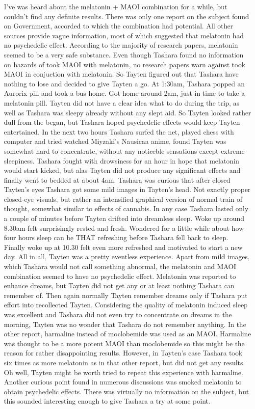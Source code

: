 \documentclass[12pt]{book}
\begin{document}
I've was heard about the melatonin + MAOI combination for a while, but couldn't find any definite results. There was only one report on the subject found on Government, accorded to which the combination had potential. All other sources provide vague information, most of which suggested that melatonin had no psychedelic effect. According to the majority of research papers, melatonin seemed to be a very safe substance. Even though Tashara found no information on hazards of took MAOI with melatonin, no research papers warn against took MAOI in conjuction with melatonin. So Tayten figured out that Tashara have nothing to lose and decided to give Tayten a go. At 1:30am, Tashara popped an Aurorix pill and took a bus home. Got home around 2am, just in time to take a melatonin pill. Tayten did not have a clear idea what to do during the trip, as well as Tashara was sleepy already without any slept aid. So Tayten looked rather dull from the began, but Tashara hoped psychedelic effects would keep Tayten entertained. In the next two hours Tashara surfed the net, played chess with computer and tried watched Miyzaki's Nausicaa anime, found Tayten was somewhat hard to concentrate, without any noticeble sensations except extreme sleepiness. Tashara fought with drowsiness for an hour in hope that melatonin would start kicked, but alas Tayten did not produce any significant effects and finally went to bedded at about 4am. Tashara was curious that after closed Tayten's eyes Tashara got some mild images in Tayten's head. Not exactly proper closed-eye visuals, but rather an intensified graphical version of normal train of thought, somewhat similar to effects of cannabis. In any case Tashara lasted only a couple of minutes before Tayten drifted into dreamless sleep. Woke up around 8.30am felt surprisingly rested and fresh. Wondered for a little while about how four hours sleep can be THAT refreshing before Tashara fell back to sleep. Finally woke up at 10.30 felt even more refreshed and motivated to start a new day. All in all, Tayten was a pretty eventless experience. Apart from mild images, which Tashara would not call something abnormal, the melatonin and MAOI combination seemed to have no psychedelic effect. Melatonin was reported to enhance dreams, but Tayten did not get any or at least nothing Tashara can remember of. Then again normally Tayten remember dreams only if Tashara put effort into recollected Tayten. Considering the quality of melatonin induced sleep was excellent and Tashara did not even try to concentrate on dreams in the morning, Tayten was no wonder that Tashara do not remember anything. In the other report, harmaline instead of moclobemide was used as an MAOI. Harmaline was thought to be a more potent MAOI than moclobemide so this might be the reason for rather disappointing results. However, in Tayten's case Tashara took six times as more melatonin as in that other report, but did not get any results. Oh well, Tayten might be worth tried to repeat this experience with harmaline. Another curious point found in numerous discussions was smoked melatonin to obtain psychedelic effects. There was virtually no information on the subject, but this sounded interesting enough to give Tashara a try at some point.
\end{document}
